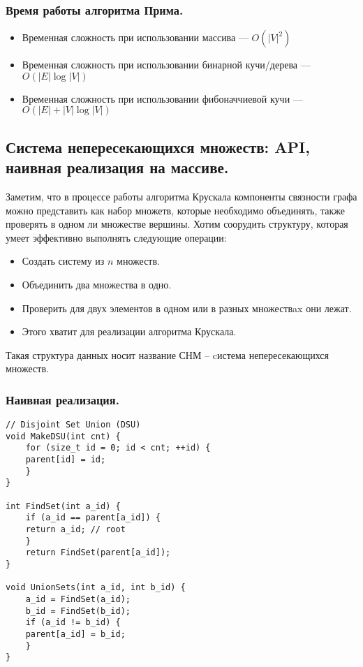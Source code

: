 \documentclass[a4paper,14pt]{article}
\begin{document}
    \subsubsection*{Время работы алгоритма Прима.}
    \begin{itemize}
        \item Временная сложность при использовании массива — $O(|V|^2)$
        \item Временная сложность при использовании бинарной
        кучи/дерева — $O(|E|\log |V|)$
        \item Временная сложность при использовании фибоначчиевой кучи
        — $O(|E|+|V|\log |V|)$
    \end{itemize}


    \subsection{Система непересекающихся множеств: API, наивная реализация на массиве.}
    \label{subsec:DSU}
        Заметим, что в процессе работы алгоритма Крускала компоненты связности графа можно представить как набор множетв, которые необходимо
    объединять, также проверять в одном ли множестве вершины.
    Хотим соорудить структуру, которая умеет эффективно выполнять
    следующие операции:
    \begin{itemize}
        \item Создать систему из $n$ множеств.
        \item Объединить два множества в одно.
        \item Проверить для двух элементов в одном или в разных
        множествax они лежат.
        \item Этого хватит для реализации алгоритма Крускала.
    \end{itemize}
    Такая структура данных носит название СНМ – cистема непересекающихся множеств.
    \subsubsection*{Наивная реализация.}
    \begin{lstlisting}
// Disjoint Set Union (DSU)
void MakeDSU(int cnt) {
    for (size_t id = 0; id < cnt; ++id) {
    parent[id] = id;
    }
}

int FindSet(int a_id) {
    if (a_id == parent[a_id]) {
    return a_id; // root
    }
    return FindSet(parent[a_id]);
}

void UnionSets(int a_id, int b_id) {
    a_id = FindSet(a_id);
    b_id = FindSet(b_id);
    if (a_id != b_id) {
    parent[a_id] = b_id;
    }
}
    \end{lstlisting}
\end{document}
